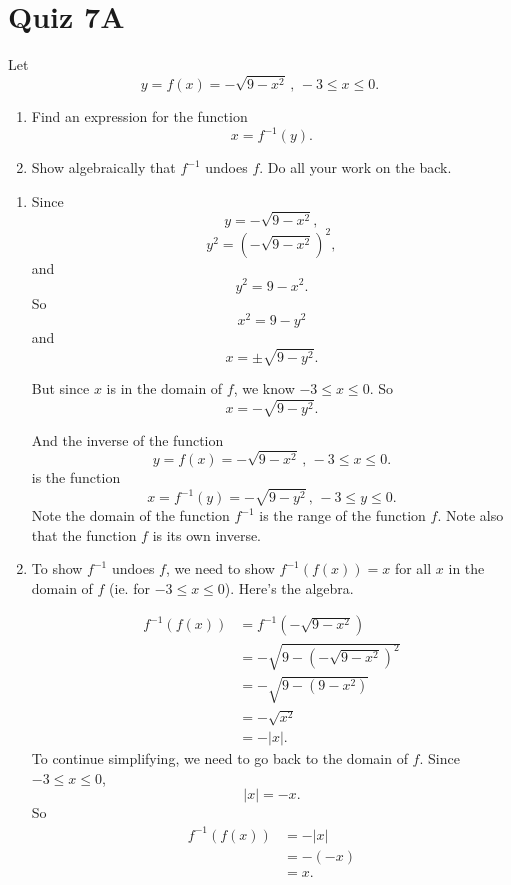 \documentclass{ximera}
\begin{document}
\section{Quiz 7A}

\begin{question} \label{Qpve31aa}
 Let 
\[
      y =  f(x) = -\sqrt{9-x^2} \, , \, -3 \leq x \leq 0.
\]

\begin{enumerate}

\item Find an expression for the function 
\[
   x = f^{-1}(y).
\]

\item Show algebraically that $f^{-1}$ undoes $f$. Do all your work on the back.
\end{enumerate}

\begin{explanation}
\begin{enumerate}
\item Since
\[
  y = -\sqrt{9-x^2},
\]
\[
  y^2 = \left( -\sqrt{9-x^2} \right)^2 ,
\]
and
\[
  y^2 = 9-x^2.
\]
So
\[
   x^2 = 9 - y^2
\]
and 
\[
   x =\pm \sqrt{9-y^2}.
\]

But since $x$ is in the domain of $f$, we know $-3\leq x \leq 0$. So 
\[
   x = - \sqrt{9-y^2}.
\]

And the inverse of the function 
\[
      y =  f(x) = -\sqrt{9-x^2} \, , \, -3 \leq x \leq 0.
\]
is the function
\[
  x = f^{-1}(y) = - \sqrt{9-y^2} \, , \, -3\leq y \leq 0.
\]
Note the domain of the function $f^{-1}$ is the range of the function $f$. Note also that the function $f$ is its own inverse.

\item To show $f^{-1}$ undoes $f$, we need to show $f^{-1}(f(x)) = x$ for all $x$ in the domain of $f$ (ie. for $-3\leq x \leq 0$).
Here's the algebra.

\begin{align*} 
  f^{-1}(f(x)) &= f^{-1}\left(  -\sqrt{9-x^2} \right)  \\
                    &= - \sqrt{9 - \left(  -\sqrt{9-x^2} \right)^2} \\
                    &= - \sqrt{9 - (9-x^2)} \\
                    &= - \sqrt{x^2} \\
                    &= - | x | .
\end{align*}
To continue simplifying, we need to go back to the domain of $f$. Since $-3\leq x \leq 0$, 
\[
  | x | = -x.
\]
So
\begin{align*}
  f^{-1}(f(x)) &= - | x |  \\
                    &= - (-x) \\
                    &= x.
\end{align*}

\end{enumerate}
\end{explanation}
\end{question}
\end{document}
